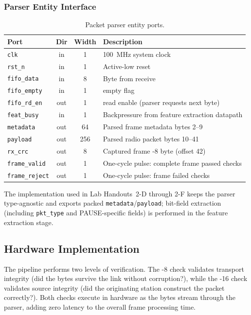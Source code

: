 \documentclass[11pt,letterpaper]{article}
\begin{document}
	\subsubsection{Parser Entity Interface}

	\begin{table}[ht!]
		\centering
		\caption{Packet parser entity ports.}
		\label{tab:parser_ports}
		\renewcommand{\arraystretch}{1.3}
		\begin{tabularx}{\textwidth}{l c c X}
			\toprule
			\textbf{Port} & \textbf{Dir} & \textbf{Width} & \textbf{Description} \\
			\midrule
			\texttt{clk} & in & 1 & 100~MHz system clock \\
			\texttt{rst\_n} & in & 1 & Active-low reset \\
			\texttt{fifo\_data} & in & 8 & Byte from receive \FIFO{} \\
			\texttt{fifo\_empty} & in & 1 & \FIFO{} empty flag \\
			\texttt{fifo\_rd\_en} & out & 1 & \FIFO{} read enable (parser requests next byte) \\
			\texttt{feat\_busy} & in & 1 & Backpressure from feature extraction datapath \\
			\texttt{metadata} & out & 64 & Parsed frame metadata bytes 2--9 \\
			\texttt{payload} & out & 256 & Parsed radio packet bytes 10--41 \\
			\texttt{rx\_crc} & out & 8 & Captured frame \CRC{}-8 byte (offset 42) \\
			\texttt{frame\_valid} & out & 1 & One-cycle pulse: complete frame passed checks \\
			\texttt{frame\_reject} & out & 1 & One-cycle pulse: frame failed checks \\
			\bottomrule
		\end{tabularx}
	\end{table}

	The implementation used in Lab Handouts~2-D through 2-F keeps the parser type-agnostic and exports packed \texttt{metadata}/\texttt{payload}; bit-field extraction (including \texttt{pkt\_type} and PAUSE-specific fields) is performed in the feature extraction stage.

	\subsection{Hardware \CRC{} Implementation}

	The pipeline performs two levels of \CRC{} verification. The \CRC{}-8 check validates transport integrity (did the bytes survive the \UART{} link without corruption?), while the \CRC{}-16 check validates source integrity (did the originating station construct the packet correctly?). Both checks execute in hardware as the bytes stream through the parser, adding zero latency to the overall frame processing time.
\end{document}
